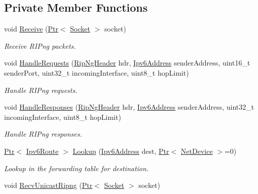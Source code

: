 \subsection*{Private Member Functions}
\begin{DoxyCompactItemize}
\item 
void \hyperlink{classns3_1_1RipNg_ae8891520b5ae87abed2e2a15d50ba4d8}{Receive} (\hyperlink{classns3_1_1Ptr}{Ptr}$<$ \hyperlink{classns3_1_1Socket}{Socket} $>$ socket)
\begin{DoxyCompactList}\small\item\em Receive R\+I\+Png packets. \end{DoxyCompactList}\item 
void \hyperlink{classns3_1_1RipNg_adb06ee7b823c0d7ae5b45b637c1ffd19}{Handle\+Requests} (\hyperlink{classns3_1_1RipNgHeader}{Rip\+Ng\+Header} hdr, \hyperlink{classns3_1_1Ipv6Address}{Ipv6\+Address} sender\+Address, uint16\+\_\+t sender\+Port, uint32\+\_\+t incoming\+Interface, uint8\+\_\+t hop\+Limit)
\begin{DoxyCompactList}\small\item\em Handle R\+I\+Png requests. \end{DoxyCompactList}\item 
void \hyperlink{classns3_1_1RipNg_ade057ef030dc8cd6479949e35315ed7b}{Handle\+Responses} (\hyperlink{classns3_1_1RipNgHeader}{Rip\+Ng\+Header} hdr, \hyperlink{classns3_1_1Ipv6Address}{Ipv6\+Address} sender\+Address, uint32\+\_\+t incoming\+Interface, uint8\+\_\+t hop\+Limit)
\begin{DoxyCompactList}\small\item\em Handle R\+I\+Png responses. \end{DoxyCompactList}\item 
\hyperlink{classns3_1_1Ptr}{Ptr}$<$ \hyperlink{classns3_1_1Ipv6Route}{Ipv6\+Route} $>$ \hyperlink{classns3_1_1RipNg_ac008f65e3fe915230191cb1099890489}{Lookup} (\hyperlink{classns3_1_1Ipv6Address}{Ipv6\+Address} dest, \hyperlink{classns3_1_1Ptr}{Ptr}$<$ \hyperlink{classns3_1_1NetDevice}{Net\+Device} $>$=0)
\begin{DoxyCompactList}\small\item\em Lookup in the forwarding table for destination. \end{DoxyCompactList}\item 
void \hyperlink{classns3_1_1RipNg_a798a6be4d3b79cb54d3f434995802049}{Recv\+Unicast\+Ripng} (\hyperlink{classns3_1_1Ptr}{Ptr}$<$ \hyperlink{classns3_1_1Socket}{Socket} $>$ socket)
\item 

\end{DoxyCompactItemize}
